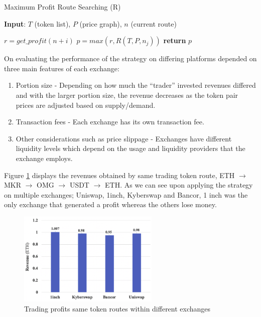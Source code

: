 \begin{algorithm}
    \caption{Maximum Profit Route Searching (R)}\label{alg:arb_sys_on_dex}
    \textbf{Input}: $T$ (token list), $P$ (price graph), $n$ (current route)
    \begin{algorithmic}
        \State $r = get\_profit(n+i)$
        \State $p = max(r, R(T, P, n_j))$
        \EndFor
        \EndFor
        \State \textbf{return} $p$
    \end{algorithmic}
\end{algorithm}

\noindent On evaluating the performance of the strategy on differing platforms depended on three main features of each exchange:
\begin{enumerate}
    \item Portion size - Depending on how much the ``trader'' invested revenues differed and with the larger portion size, the revenue decreases as the token pair prices are adjusted based on supply/demand.
    \item Transaction fees - Each exchange has its own transaction fee.
    \item Other considerations such as price slippage - Exchanges have different liquidity levels which depend on the usage and liquidity providers that the exchange employs.
\end{enumerate}

\noindent Figure \ref{fig:arb_on_diff_exchanges} displays the revenues obtained by same trading token route, ETH $\rightarrow$ MKR $\rightarrow$ OMG $\rightarrow$ USDT $\rightarrow$ ETH. As we can see upon applying the strategy on multiple exchanges; Uniswap, 1inch, Kyberswap and Bancor, 1 inch was the only exchange that generated a profit whereas the others lose money. 

\begin{figure}[!htb]
    \centering
    \includegraphics[width=0.6\textwidth]{background/Images/revenue_oncyclic_arb.png}
    \caption{Trading profits same token routes within different exchanges~\cite{boonpeam2021arbitrage} \label{fig:arb_on_diff_exchanges}}
\end{figure}

